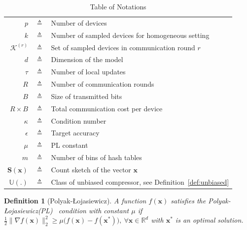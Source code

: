 \documentclass[sigconf, anonymous, review]{acmart}
\newcommand{\pl}{Polyak-\L{}ojasiewicz}
\newtheorem{definition}{Definition}
\begin{document}
\begin{table}[htbp]\caption{Table of Notations}
\begin{center}%
\begin{tabular}{r c p{10cm} }
\toprule
$p$ & $\triangleq$ & Number of devices\\
$k$ & $\triangleq$ & Number of sampled devices for homogeneous setting\\
$\mathcal{K}^{(r)}$ & $\triangleq$ & Set of sampled devices in communication round $r$\\
$d$ & $\triangleq$ &  Dimension of the model \\
$\tau$ & $\triangleq$ & Number of local updates\\
$R$ & $\triangleq$ & Number of communication rounds\\
$B$ & $\triangleq$ &  Size of transmitted bits \\
$R\times B$ & $\triangleq$ &  Total communication cost per device \\
$\kappa$ & $\triangleq$ & Condition number\\
$\epsilon$ & $\triangleq$ & Target accuracy\\
$\mu$ & $\triangleq$ & PL constant \\
$m$ & $\triangleq$ &  Number of bins of hash tables \\
 $\mathbf{S}(\boldsymbol{x})$  & $\triangleq$ &  Count sketch of the vector $\boldsymbol{x}$\\
 $\mathbb{U}(.)$  & $\triangleq$ &  Class of unbiased compressor, see Definition~\ref{def:unbiased}\\
\bottomrule
\end{tabular}
\end{center}
\label{tab:notations}
\end{table}

\begin{definition}[\pl]\label{assum:pl}
A function $f(\boldsymbol{x})$ satisfies the \pl (PL)~ condition with constant $\mu$ if $\frac{1}{2}\|\nabla f(\boldsymbol{x})\|_2^2\geq \mu\big(f(\boldsymbol{x})-f(\boldsymbol{x}^*)\big),\: \forall \boldsymbol{x}\in\mathbb{R}^d $ with $\boldsymbol{x}^*$ is an optimal solution.
\end{definition}


\end{document}
